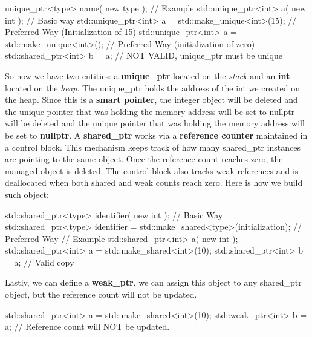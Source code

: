 \documentclass{report}
\begin{document}
    \begin{cppcode}
unique_ptr<type> name( new type );
// Example
std::unique_ptr<int> a( new int ); // Basic way 
std::unique_ptr<int> a = std::make_unique<int>(15); // Preferred Way (Initialization of 15)
std::unique_ptr<int> a = std::make_unique<int>(); // Preferred Way (initialization of zero)
std::shared_ptr<int> b = a; //  NOT VALID, unique_ptr must be unique
    \end{cppcode}
    
    \bigbreak \noindent 
    So now we have two entities: a \textbf{unique\_ptr} located on the \textit{stack} and an \textbf{int} located on the \textit{heap}. The unique\_ptr holds the address of the int we created on the heap. Since this is a \textbf{smart pointer}, the integer object will be deleted and the unique pointer that was holding the memory address will be set to nullptr will be deleted and the unique pointer that was holding the memory address will be set to \textbf{nullptr}.
    \bigbreak \noindent 
    A \textbf{shared\_ptr} works via a \textbf{reference counter} maintained in a control block. This mechanism keeps track of how many shared\_ptr instances are pointing to the same object. Once the reference count reaches zero, the managed object is deleted. The control block also tracks weak references and is deallocated when both shared and weak counts reach zero. Here is how we build such object:
    \bigbreak \noindent 
    
    \begin{cppcode}
std::shared_ptr<type> identifier( new int ); // Basic Way
std::shared_ptr<type> identifier = std::make_shared<type>(initialization); // Preferred Way
// Example
std::shared_ptr<int> a( new int );
std::shared_ptr<int> a = std::make_shared<int>(10);
std::shared_ptr<int> b = a; // Valid copy
    \end{cppcode}
    

    \bigbreak \noindent 
    Lastly, we can define a \textbf{weak\_ptr}, we can assign this object to any shared\_ptr object, but the reference count will not be updated.
    \bigbreak \noindent 
    
    \begin{cppcode}
std::shared_ptr<int> a = std::make_shared<int>(10);
std::weak_ptr<int> b = a; // Reference count will NOT be updated.
    \end{cppcode}
    

    \pagebreak
    \bigbreak \noindent 
\end{document}
